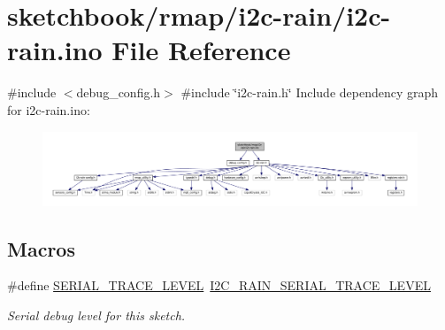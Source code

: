\hypertarget{i2c-rain_8ino}{}\section{sketchbook/rmap/i2c-\/rain/i2c-\/rain.ino File Reference}
\label{i2c-rain_8ino}
{\ttfamily \#include $<$debug\+\_\+config.\+h$>$}\newline
{\ttfamily \#include \char`\"{}i2c-\/rain.\+h\char`\"{}}\newline
Include dependency graph for i2c-\/rain.ino\+:
\nopagebreak
\begin{figure}[H]
\begin{center}
\leavevmode
\includegraphics[width=350pt]{i2c-rain_8ino__incl}
\end{center}
\end{figure}
\subsection*{Macros}
\begin{DoxyCompactItemize}
\item 
\mbox{\label{i2c-rain_8ino_a31fa5c36fa17c66feec7a67b76c3e786}} 
\#define \hyperlink{i2c-rain_8ino_a31fa5c36fa17c66feec7a67b76c3e786}{S\+E\+R\+I\+A\+L\+\_\+\+T\+R\+A\+C\+E\+\_\+\+L\+E\+V\+EL}~\hyperlink{debug__config_8h_ad3ed083a5171e08bb1e3b04391228a4f}{I2\+C\+\_\+\+R\+A\+I\+N\+\_\+\+S\+E\+R\+I\+A\+L\+\_\+\+T\+R\+A\+C\+E\+\_\+\+L\+E\+V\+EL}
\begin{DoxyCompactList}\small\item\em Serial debug level for this sketch. \end{DoxyCompactList}\end{DoxyCompactItemize}
